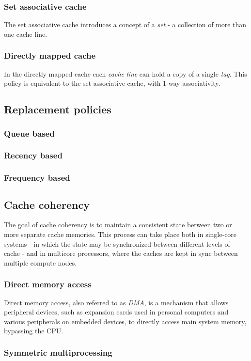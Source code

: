 \subsubsection{Set associative cache}
The set associative cache introduces a concept of a \textit{set} - a collection
of more than one cache line.

\subsubsection{Directly mapped cache}
In the directly mapped cache each \textit{cache line} can hold a copy of
a single \textit{tag}. This policy is equivalent to the set associative cache, with
1-way associativity.

%
\subsection{Replacement policies}
\subsubsection{Queue based}
\subsubsection{Recency based}
\subsubsection{Frequency based}
%
\subsection{Cache coherency}

The goal of cache coherency is to maintain a consistent state between two or
more separate cache memories. This process can take place both in single-core
systems—in which the state may be synchronized between different levels of cache
- and in multicore processors, where the caches are kept in sync between multiple
compute nodes.

\subsubsection{Direct memory access}

Direct memory access, also referred to as \textit{DMA}, is a mechanism that
allows peripheral devices, such as expansion cards used in personal computers
and various peripherals on embedded devices, to directly access main system memory,
bypassing the CPU.

\subsubsection{Symmetric multiprocessing}
%
